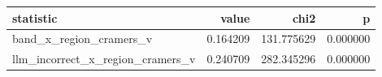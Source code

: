 \begin{tabular}{lrrr}
\toprule
statistic & value & chi2 & p \\
\midrule
band\_x\_region\_cramers\_v & 0.164209 & 131.775629 & 0.000000 \\
llm\_incorrect\_x\_region\_cramers\_v & 0.240709 & 282.345296 & 0.000000 \\
\bottomrule
\end{tabular}

